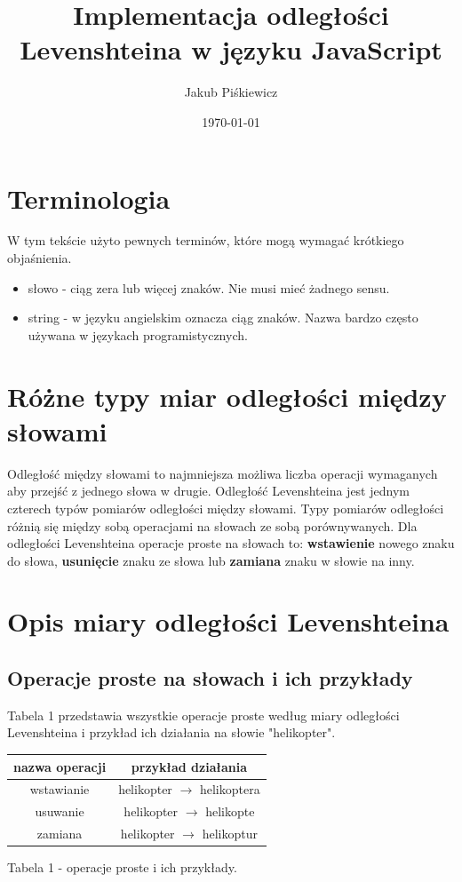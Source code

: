 \documentclass[a4paper,12pt]{article}
\title{Implementacja odległości Levenshteina w języku JavaScript}
\author{Jakub Piśkiewicz}
\date{\today}
\begin{document}
\maketitle

\section{Terminologia}
W tym tekście użyto pewnych terminów, które mogą wymagać krótkiego objaśnienia.
\begin{itemize}
    \item słowo - ciąg zera lub więcej znaków. Nie musi mieć żadnego sensu.
    \item string - w języku angielskim oznacza ciąg znaków. Nazwa bardzo często używana w językach programistycznych.
\end{itemize}

\section{Różne typy miar odległości między słowami}
Odległość między słowami to najmniejsza możliwa 
liczba operacji wymaganych aby przejść z jednego słowa w drugie.
Odległość Levenshteina jest jednym czterech typów pomiarów odległości
między słowami. Typy pomiarów odległości różnią się między
sobą operacjami na słowach ze sobą porównywanych. \cite{wiki::edit}
Dla odległości Levenshteina operacje proste na słowach to:
\textbf{wstawienie} nowego znaku do słowa, 
\textbf{usunięcie} znaku ze słowa lub
\textbf{zamiana} znaku w słowie na inny. \cite{wiki::levenshteinpl}

\section{Opis miary odległości Levenshteina}
\subsection{Operacje proste na słowach i ich przykłady}
Tabela 1 przedstawia wszystkie operacje proste według miary odległości
Levenshteina i przykład ich działania na słowie "helikopter".

\begin{center}
    \begin{tabular}{|c|c|}
        \hline
        nazwa operacji      &       przykład działania\\
        \hline
        wstawianie          &       helikopter \( \rightarrow \) helikoptera\\
        \hline
        usuwanie            &       helikopter \( \rightarrow \) helikopte\\
        \hline
        zamiana             &       helikopter \( \rightarrow \) helikoptur\\
        \hline
    \end{tabular}

    \vspace{12pt}
    Tabela 1 - operacje proste i ich przykłady.
\end{center}
\end{document}
